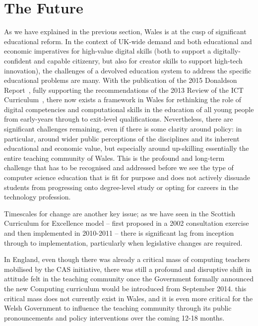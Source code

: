 \documentclass{sig-alternate}
\begin{document}
\section{The Future}\label{conclusions}

As we have explained in the previous section, Wales is at the cusp of
significant educational reform. In the context of UK-wide demand and
both educational and economic imperatives for high-value digital
skills (both to support a digitally-confident and capable citizenry,
but also for creator skills to support high-tech innovation), the
challenges of a devolved education system to address the specific
educational problems are many. With the publication of the 2015
Donaldson Report~\cite{Donaldson:2015},
fully supporting the recommendations of the 2013
Review of the ICT Curriculum~\cite{welshictreview:2013},
there now exists a framework in Wales for
rethinking the role of digital competencies and computational skills
in the education of all young people from early-years through to
exit-level qualifications. Nevertheless, there are significant challenges
remaining, even if there is some clarity around policy: in particular,
around wider public perceptions of the disciplines and its inherent
educational and economic value, but especially around up-skilling
essentially the entire teaching community of Wales. This is the
profound and long-term challenge that has to be recognised and
addressed before we see the type of computer science education that is
fit for purpose and does not actively dissuade students from
progressing onto degree-level study or opting for careers in the
technology profession.

Timescales for change are another key issue; as we have seen in the
Scottish Curriculum for Excellence model -- first proposed in a 2002
consultation exercise and then implemented in 2010-2011 -- there is
significant lag from inception through to implementation, particularly
when legislative changes are required.

In England, even though there was already a critical mass of computing
teachers mobilised by the CAS initiative, there was still a profound
and disruptive shift in attitude felt in the teaching community once
the Government formally announced the new Computing curriculum would
be introduced from September 2014.
this critical mass does not currently exist in Wales, and it
is even more critical for the Welsh Government to influence the
teaching community through its public pronouncements and policy
interventions over the coming 12-18 months.
\end{document}
